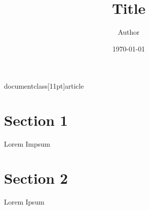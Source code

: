 documentclass[11pt]{article}

\usepackage{sectsty}
\usepackage{graphicx}

\topmargin=-0.45in
\evensidemargin=0in
\oddsidemargin=0in
\textwidth=6.5in
\textheight=9.0in
\headsep=0.25in

\title{ Title}
\author{ Author }
\date{\today}


\maketitle	
\pagebreak



\section{Section 1}

Lorem Impsum


\pagebreak
\section{Section 2}
Lorem Ipsum \\


